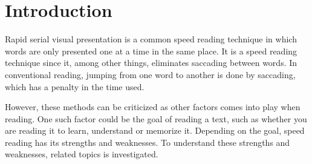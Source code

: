 \section{Introduction}
Rapid serial visual presentation is a common speed reading technique in which words are only presented one at a time in the same place. It is a speed reading technique since it, among other things, eliminates saccading between words. In conventional reading, jumping from one word to another is done by saccading, which has a penalty in the time used.

However, these methods can be criticized as other factors comes into play when reading. One such factor could be the goal of reading a text, such as whether you are reading it to learn, understand or memorize it. Depending on the goal, speed reading has its strengths and weaknesses. To understand these strengths and weaknesses, related topics is investigated.